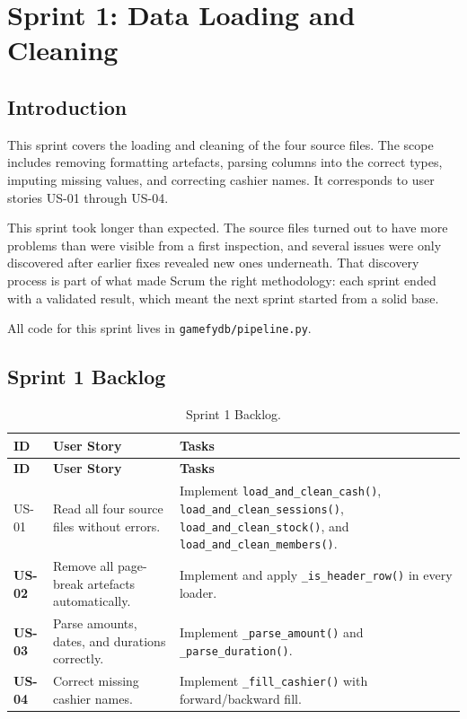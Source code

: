 \documentclass[12pt, a4paper]{report}
\begin{document}
\chapter{Sprint 1: Data Loading and Cleaning}

\section{Introduction}

This sprint covers the loading and cleaning of the four source files. The scope
includes removing formatting artefacts, parsing columns into the correct types,
imputing missing values, and correcting cashier names. It corresponds to user
stories US-01 through US-04.

This sprint took longer than expected. The source files turned out to have more
problems than were visible from a first inspection, and several issues were only
discovered after earlier fixes revealed new ones underneath. That discovery process
is part of what made Scrum the right methodology: each sprint ended with a validated
result, which meant the next sprint started from a solid base.

All code for this sprint lives in \texttt{gamefydb/pipeline.py}.

\section{Sprint 1 Backlog}

\begin{longtable}{>{\bfseries}p{1.3cm} p{4.2cm} p{7cm}}
  \caption{Sprint 1 Backlog.\label{tab:sprint1_backlog}} \\
  \toprule
  \textbf{ID} & \textbf{User Story} & \textbf{Tasks} \\
  \midrule
  \endfirsthead
  \toprule
  \textbf{ID} & \textbf{User Story} & \textbf{Tasks} \\
  \midrule
  \endhead
  \bottomrule
  \endfoot

  US-01 & Read all four source files without errors.
        & Implement \texttt{load\_and\_clean\_cash()},
          \texttt{load\_and\_clean\_sessions()},
          \texttt{load\_and\_clean\_stock()}, and
          \texttt{load\_and\_clean\_members()}.\\[4pt]
  US-02 & Remove all page-break artefacts automatically.
        & Implement and apply \texttt{\_is\_header\_row()} in every loader. \\[4pt]
  US-03 & Parse amounts, dates, and durations correctly.
        & Implement \texttt{\_parse\_amount()} and \texttt{\_parse\_duration()}. \\[4pt]
  US-04 & Correct missing cashier names.
        & Implement \texttt{\_fill\_cashier()} with forward/backward fill. \\
\end{longtable}
\end{document}
